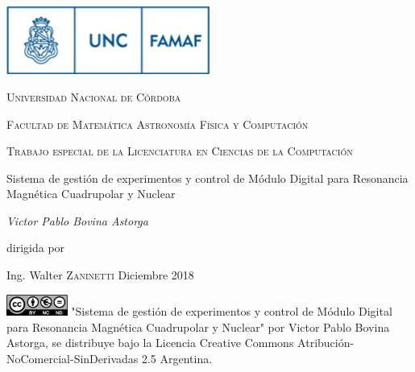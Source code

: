 

\begin{titlepage}
	\centering
	\includegraphics[width=0.50\textwidth]{../figures/famaf-logo.png}\par\vspace{1cm}
    {\scshape\LARGE Universidad Nacional de C\'ordoba \par}
    {\scshape\LARGE Facultad de Matem\'atica Astronom\'ia F\'isica y Computaci\'on \par}
	\vspace{1cm}
	{\scshape\Large Trabajo especial de la Licenciatura en
    Ciencias de la Computaci\'on\par}
	\vspace{1.5cm}
	{\huge Sistema de gesti\'on de experimentos y control de M\'odulo Digital para Resonancia Magn\'etica Cuadrupolar y Nuclear\par}
	\vspace{2cm}
	{\Large\itshape Victor Pablo Bovina Astorga\par}
	\vfill
    dirigida por \par 
    Ing. Walter \textsc{Zaninetti}
    \vfill
    Diciembre 2018
    \vfill

\includegraphics[width=0.15\textwidth]{../figures/cc.png}
\vfill
{\tiny "Sistema de gesti\'on de experimentos y control de M\'odulo Digital para Resonancia Magn\'etica Cuadrupolar y  Nuclear" por Victor Pablo Bovina Astorga, se distribuye bajo la Licencia Creative Commons
Atribución-NoComercial-SinDerivadas 2.5 Argentina.}
\end{titlepage}